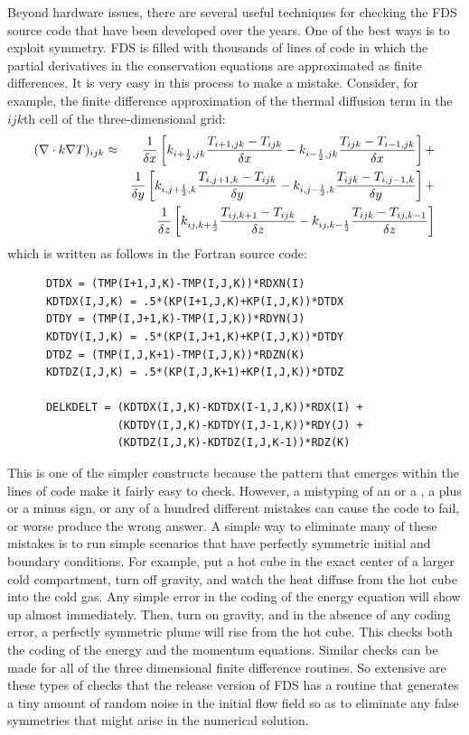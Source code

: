 \documentclass[11pt]{book}
\begin{document}
Beyond hardware issues, there are several useful techniques for checking the FDS source code that have been developed over the years. One of the
best ways is to exploit symmetry. FDS is filled with thousands of lines of code in which the partial derivatives in the conservation equations are
approximated as finite differences. It is very easy in this process to make a mistake. Consider, for example, the finite difference approximation of
the thermal diffusion term in the $ijk$th cell of the three-dimensional grid:
\begin{eqnarray*}
(\nabla \cdot k \nabla T)_{ijk} &\approx&
              \frac{1}{\delta x}
         \left[k_{i+\frac{1}{2},jk}\frac{T_{i+1,jk}-T_{ijk}}{\delta x}
              -k_{i-\frac{1}{2},jk}\frac{T_{ijk}-T_{i-1,jk}}{\delta x}\right]+  \nonumber \\
            &&\frac{1}{\delta y}
         \left[k_{i,j+\frac{1}{2},k}\frac{T_{i,j+1,k}-T_{ijk}}{\delta y}
              -k_{i,j-\frac{1}{2},k}\frac{T_{ijk}-T_{i,j-1,k}}{\delta y}\right]+ \nonumber \\
            &&\frac{1}{\delta z}
         \left[k_{ij,k+\frac{1}{2}}\frac{T_{ij,k+1}-T_{ijk}}{\delta z}
              -k_{ij,k-\frac{1}{2}}\frac{T_{ijk}-T_{ij,k-1}}{\delta z}\right]
\end{eqnarray*}
which is written as follows in the Fortran source code:
\begin{lstlisting}
      DTDX = (TMP(I+1,J,K)-TMP(I,J,K))*RDXN(I)
      KDTDX(I,J,K) = .5*(KP(I+1,J,K)+KP(I,J,K))*DTDX
      DTDY = (TMP(I,J+1,K)-TMP(I,J,K))*RDYN(J)
      KDTDY(I,J,K) = .5*(KP(I,J+1,K)+KP(I,J,K))*DTDY
      DTDZ = (TMP(I,J,K+1)-TMP(I,J,K))*RDZN(K)
      KDTDZ(I,J,K) = .5*(KP(I,J,K+1)+KP(I,J,K))*DTDZ

      DELKDELT = (KDTDX(I,J,K)-KDTDX(I-1,J,K))*RDX(I) +
                 (KDTDY(I,J,K)-KDTDY(I,J-1,K))*RDY(J) +
                 (KDTDZ(I,J,K)-KDTDZ(I,J,K-1))*RDZ(K)
\end{lstlisting}
This is one of the simpler constructs because the pattern that emerges within the lines of code make it fairly easy to check. However, a mistyping
of an  or a , a plus or a minus sign, or any of a hundred different mistakes can cause the code to fail, or worse produce the wrong
answer. A simple way to eliminate many of these mistakes is to run simple scenarios that have perfectly symmetric initial and boundary conditions.
For example, put a hot cube in the exact center of a larger cold compartment, turn off gravity, and watch the heat diffuse from the hot cube into the
cold gas. Any simple error in the coding of the energy equation will show up almost immediately. Then, turn on gravity, and in the absence of any
coding error, a perfectly symmetric plume will rise from the hot cube. This checks both the coding of the energy and the momentum equations. Similar
checks can be made for all of the three dimensional finite difference routines. So extensive are these types of checks that the release version of
FDS has a routine that generates a tiny amount of random noise in the initial flow field so as to eliminate any false symmetries that might arise in
the numerical solution.
\end{document}
